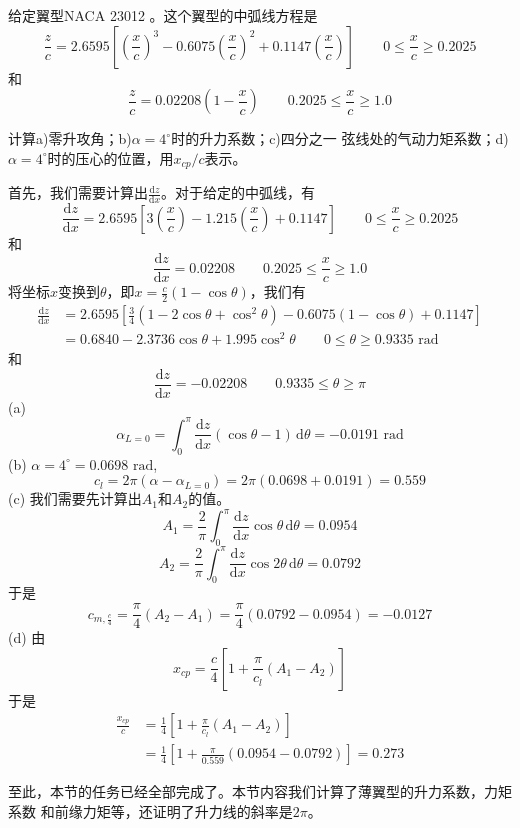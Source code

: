 \begin{example}
  给定翼型NACA 23012 。这个翼型的中弧线方程是
  \[
    \frac{z}{c}=2.6595\left[\left(\frac{x}{c}\right)^3 -0.6075
    \left(\frac{x}{c}\right)^2 +0.1147\left(\frac{x}{c}\right) 
  \right] \qquad 0\leq \frac{x}{c} \geq 0.2025 
  \]
  和
  \[
    \frac{z}{c}=0.02208\left(1-\frac{x}{c}\right) \qquad 0.2025 \leq \frac{x}{c} \geq 1.0 
  \]

计算a)零升攻角；b)$\alpha=4^\circ$时的升力系数；c)四分之一
弦线处的气动力矩系数；d)$\alpha=4^\circ$时的压心的位置，用$x_{cp} / c $表示。

首先，我们需要计算出$\frac{\mathrm{d}z }{\mathrm{d} x}$。对于给定的中弧线，有
\[
  \frac{\mathrm{d}z }{\mathrm{d}x}=2.6595
  \left[3\left(\frac{x}{c}\right)-1.215\left(\frac{x}{c}\right)+0.1147\right]
  \qquad 0 \leq \frac{x}{c} \geq 0.2025
\]
和
\[
  \frac{\mathrm{d}z }{\mathrm{d}x}=0.02208 \qquad 0.2025 \leq \frac{x}{c} \geq 1.0
\]
将坐标$x$变换到$\theta$，即$x=\frac{c}{2}(1-\cos \theta)$，我们有
\[
  \begin{split}
    \frac{\mathrm{d}z }{\mathrm{d}x}&=2.6595
  \left[\frac{3}{4}(1-2\cos \theta +\cos ^2 \theta)-0.6075(1-\cos \theta)+0.1147\right] \\ 
                                    &=
                                    0.6840-2.3736 \cos \theta +1.995 \cos ^2 \theta
                                    \qquad  0 \leq \theta \geq 0.9335 \,\,\mathrm{rad}
  \end{split}
\]
和
\[
  \frac{\mathrm{d}z }{\mathrm{d} x}=-0.02208 \qquad 0.9335 \leq \theta \geq \pi
\]
(a)
\[
  \alpha_{L=0}=\int _0^\pi \frac{\mathrm{d}z }{\mathrm{d}x}(\cos \theta-1)\,\mathrm{d}\theta=
  -0.0191\,\, \mathrm{rad}
\]
(b)
$\alpha=4^\circ=0.0698 \,\,\mathrm{rad}$,
\[
  c_l=2\pi (\alpha-\alpha_{L=0})=2\pi(0.0698+0.0191)=0.559
\]
(c)
我们需要先计算出$A_1$和$A_2$的值。
\[
  A_1=\frac{2}{\pi}\int _0^\pi \frac{\mathrm{d}z }{\mathrm{d}x }\cos \theta\,\mathrm{d} \theta
  =0.0954
\]
\[
  A_2=\frac{2}{\pi}\int _0^\pi \frac{\mathrm{d}z }{\mathrm{d}x} \cos 2 \theta\, \mathrm{d} \theta
  =0.0792
\]
于是
\[
  c_{m,\frac{c}{4}}=\frac{\pi}{4}(A_2-A_1)=\frac{\pi}{4}(0.0792-0.0954)=-0.0127
\]
(d)
由
\[
  x_{cp}=\frac{c}{4}\left[1+\frac{\pi}{c_l}\left(A_1-A_2\right)\right]
\]
于是
\[ 
  \begin{split}
    \frac{x_{cp}}{c}&=\frac{1}{4}\left[1+\frac{\pi}{c_l}\left(A_1-A_2\right)\right]\\
                    &=\frac{1}{4}\left[1+\frac{\pi}{0.559}(0.0954-0.0792)\right]=0.273
  \end{split}
\]
\end{example}

至此，本节的任务已经全部完成了。本节内容我们计算了薄翼型的升力系数，力矩系数
和前缘力矩等，还证明了升力线的斜率是$2\pi$。


